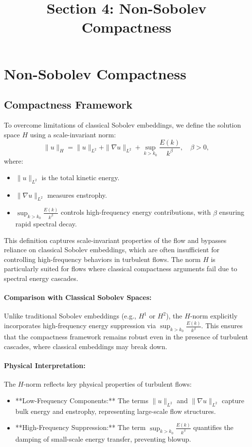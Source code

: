 \documentclass[12pt]{article}
\theoremstyle{definition}
\begin{document}
\title{Section 4: Non-Sobolev Compactness}
\author{}
\date{}
\maketitle

\section{Non-Sobolev Compactness}

\subsection{Compactness Framework}
To overcome limitations of classical Sobolev embeddings, we define the solution space $H$ using a scale-invariant norm:
\[
\|u\|_H = \|u\|_{L^2} + \|\nabla u\|_{L^2} + \sup_{k > k_0} \frac{E(k)}{k^\beta}, \quad \beta > 0,
\]
where:
\begin{itemize}
    \item $\|u\|_{L^2}$ is the total kinetic energy.
    \item $\|\nabla u\|_{L^2}$ measures enstrophy.
    \item $\sup_{k > k_0} \frac{E(k)}{k^\beta}$ controls high-frequency energy contributions, with $\beta$ ensuring rapid spectral decay.
\end{itemize}

This definition captures scale-invariant properties of the flow and bypasses reliance on classical Sobolev embeddings, which are often insufficient for controlling high-frequency behaviors in turbulent flows. The norm $H$ is particularly suited for flows where classical compactness arguments fail due to spectral energy cascades.

\paragraph{Comparison with Classical Sobolev Spaces:}
Unlike traditional Sobolev embeddings (e.g., $H^1$ or $H^2$), the $H$-norm explicitly incorporates high-frequency energy suppression via $\sup_{k > k_0} \frac{E(k)}{k^\beta}$. This ensures that the compactness framework remains robust even in the presence of turbulent cascades, where classical embeddings may break down.

\paragraph{Physical Interpretation:}
The $H$-norm reflects key physical properties of turbulent flows:
\begin{itemize}
    \item **Low-Frequency Components:** The terms $\|u\|_{L^2}$ and $\|\nabla u\|_{L^2}$ capture bulk energy and enstrophy, representing large-scale flow structures.
    \item **High-Frequency Suppression:** The term $\sup_{k > k_0} \frac{E(k)}{k^\beta}$ quantifies the damping of small-scale energy transfer, preventing blowup.
\end{itemize}
\end{document}
